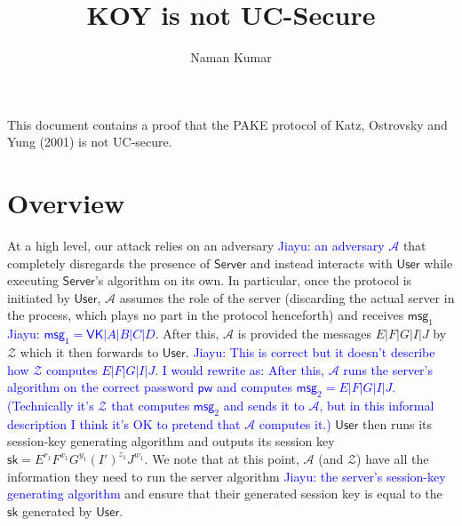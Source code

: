 \documentclass[12pt,a4paper]{article}
\title{\textbf{KOY is not UC-Secure}}
\author{Naman Kumar}
\newcommand{\env}{\mathcal{Z}}
\newcommand{\adv}{\mathcal{A}}
\newcommand{\user}{\mathsf{User}}
\newcommand{\sk}{\mathsf{sk}}
\newcommand{\pw}{\mathsf{pw}}
\newcommand{\server}{\mathsf{Server}}
\newcommand{\msg}[1]{\mathsf{msg}_{#1}}
\def\xjy#1{\textcolor{blue}{Jiayu: #1}}
\begin{document}
	\maketitle
	
	This document contains a proof that the PAKE protocol of Katz, Ostrovsky and Yung (2001) is not UC-secure.
	
	\section{Overview}
	
	At a high level, our attack relies on an adversary \xjy{an adversary $\adv$} that completely disregards the presence of $\server$ and instead interacts with $\user$ while executing $\server$'s algorithm on its own. In particular, once the protocol is initiated by $\user$, $\adv$ assumes the role of the server (discarding the actual server in the process, which plays no part in the protocol henceforth) and receives $\msg{1}$ \xjy{$\msg{1} = \mathsf{VK}|A|B|C|D$}. After this, $\adv$ is provided the messages $E|F|G|I|J$ by $\env$ which it then forwards to $\user$. \xjy{This is correct but it doesn't describe how $\env$ computes $E|F|G|I|J$. I would rewrite as: After this, $\adv$ runs the server's algorithm on the correct password $\pw$ and computes $\msg{2} = E|F|G|I|J$. (Technically it's $\env$ that computes $\msg{2}$ and sends it to $\adv$, but in this informal description I think it's OK to pretend that $\adv$ computes it.)} $\user$ then runs its session-key generating algorithm and outputs its session key $\sk = E^{r_1}F^{x_1}G^{y_1}(I')^{z_1}J^{w_1}$. We note that at this point, $\adv$ (and $\env$) have all the information they need to run the server algorithm \xjy{the server's session-key generating algorithm} and ensure that their generated session key is equal to the $\sk$ generated by $\user$.
	
\end{document}
